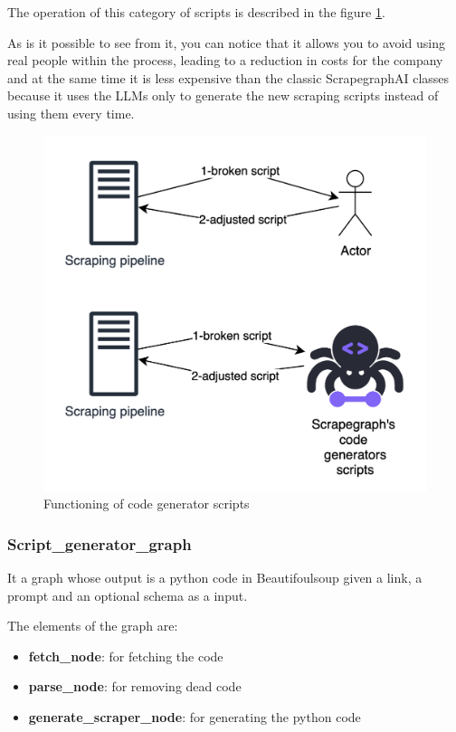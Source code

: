 The operation of this category of scripts is described in the figure \ref{fig:actually indians}.

As is it possible to see from it, you can notice that it allows you to avoid using real people within the process, leading to a reduction in costs for the company and at the same time it is less expensive than the classic ScrapegraphAI  classes because it uses the LLMs only to generate the new scraping scripts instead of using them every time.

\begin{figure}[H]
    \centering
    \includegraphics[width=1\linewidth]{Assets/code_generator_scripts.png}
    \caption{Functioning of code generator scripts}
    \label{fig:actually indians}
\end{figure}
\subsubsection{Script\_generator\_graph}
It a graph whose output is a python code in Beautifoulsoup given a link, a prompt and an optional schema as a input.

The elements of the graph are:

\begin{itemize}
    \item \textbf{fetch\_node}: for fetching the code
    \item \textbf{parse\_node}: for removing dead code
    \item \textbf{generate\_scraper\_node}: for generating the python code
\end{itemize}

